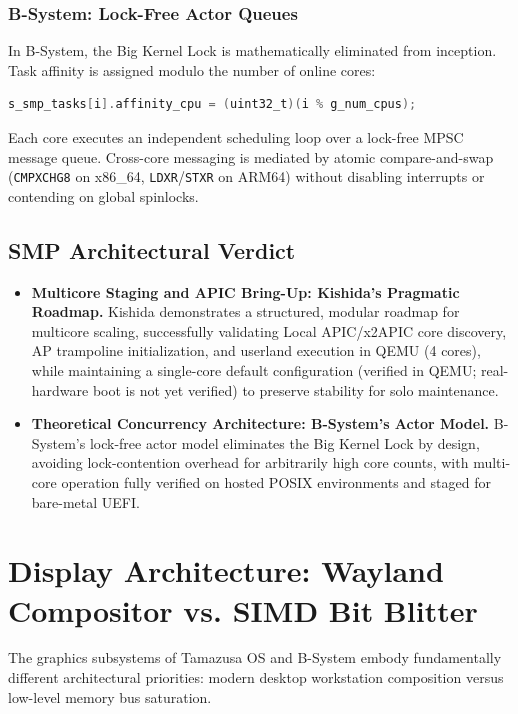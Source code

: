 \documentclass[10pt,journal,compsoc,twocolumn]{article}
\begin{document}
\subsubsection{B-System: Lock-Free Actor Queues}
In B-System, the Big Kernel Lock is mathematically eliminated from inception. Task affinity is assigned modulo the number of online cores:
\begin{lstlisting}[language=C]
s_smp_tasks[i].affinity_cpu = (uint32_t)(i % g_num_cpus);
\end{lstlisting}
Each core executes an independent scheduling loop over a lock-free MPSC message queue. Cross-core messaging is mediated by atomic compare-and-swap (\texttt{CMPXCHG8} on x86\_64, \texttt{LDXR}/\texttt{STXR} on ARM64) without disabling interrupts or contending on global spinlocks.

\subsection{SMP Architectural Verdict}
\begin{itemize}[leftmargin=*]
    \item \textbf{Multicore Staging and APIC Bring-Up: Kishida's Pragmatic Roadmap.} Kishida demonstrates a structured, modular roadmap for multicore scaling, successfully validating Local APIC/x2APIC core discovery, AP trampoline initialization, and userland execution in QEMU (4 cores), while maintaining a single-core default configuration (verified in QEMU; real-hardware boot is not yet verified) to preserve stability for solo maintenance.
    \item \textbf{Theoretical Concurrency Architecture: B-System's Actor Model.} B-System's lock-free actor model eliminates the Big Kernel Lock by design, avoiding lock-contention overhead for arbitrarily high core counts, with multi-core operation fully verified on hosted POSIX environments and staged for bare-metal UEFI.
\end{itemize}

\section{Display Architecture: Wayland Compositor vs. SIMD Bit Blitter}
\label{sec:blitter}

The graphics subsystems of Tamazusa OS and B-System embody fundamentally different architectural priorities: modern desktop workstation composition versus low-level memory bus saturation.
\end{document}

